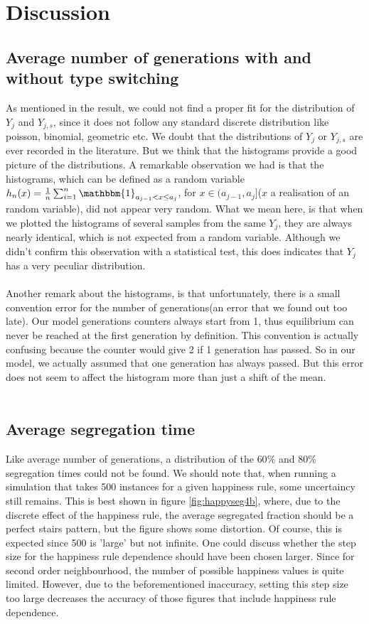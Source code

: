 \section{Discussion}
\subsection{Average number of generations with and without type switching}
As mentioned in the result, we could not find a proper fit for the distribution of $Y_{j}$ and $Y_{j,s}$, since it does not follow any standard discrete distribution like poisson, binomial, geometric etc. We doubt that the distributions of $Y_j$ or $Y_{j,s}$ are ever recorded in the literature. But we think that the histograms provide a good picture of the distributions. A remarkable observation we had is that the histograms, which can be defined as a random variable $h_n(x)=\frac{1}{n}\sum^n_{i=1}\mathbbm{1}_{a_{j-1}<x\leq a_j}$, for $x\in (a_{j-1},a_j]$($x$ a realisation of an random variable),  did not appear very random. What we mean here, is that when we plotted the histograms of several samples from the same $Y_j$, they are always nearly identical, which is not expected from a random variable. Although we didn't confirm this observation with a statistical test, this does indicates that $Y_j$ has a very peculiar distribution.\\
\\
Another remark about the histograms, is that unfortunately, there is a small convention error for the number of generations(an error that we found out too late). Our model generations counters always start from 1, thus equilibrium can never be reached at the first generation by definition. This convention is actually confusing because the counter would give 2 if 1 generation has passed. So in our model, we actually assumed that one generation has always passed. But this error does not seem to affect the histogram more than just a shift of the mean.\\
\\
\subsection{Average segregation time}
Like average number of generations, a distribution of the $60\%$ and $80\%$ segregation times could not be found. We should note that, when running a simulation that takes 500 instances for a given happiness rule, some uncertaincy still remains. This is best shown in figure \ref{fig:happyseg4b}, where, due to the discrete effect of the happiness rule, the average segregated fraction should be a perfect stairs pattern, but the figure shows some distortion. Of course, this is expected since 500 is 'large' but not infinite. One could discuss whether the step size for the happiness rule dependence should have been chosen larger. Since for second order neighbourhood, the number of possible happiness values is quite limited. However, due to the beforementioned inaccuracy, setting this step size too large decreases the accuracy of those figures that include happiness rule dependence.


  